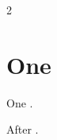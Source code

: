 \documentclass{article}
\begin{document}
\bibliographyunit[\section]
\begin{multicols}{2}
\section{One}
One \cite{alpha}.
\end{multicols}
After \cite{zeta}.
\end{document}
